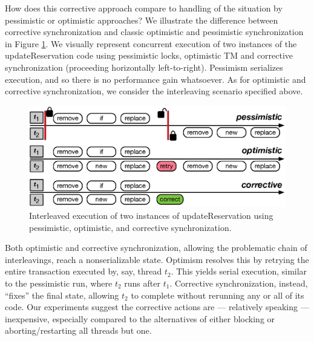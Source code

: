 %

How does this corrective approach compare to handling of the situation by pessimistic or optimistic approaches?
%
We illustrate the difference between corrective synchronization and classic optimistic and pessimistic synchronization in Figure \ref{Fi:motivatingOverview}. We visually represent concurrent execution of two instances of the \textsf{updateReservation} code using pessimistic locks, optimistic TM and corrective synchronization (proceeding horizontally left-to-right). Pessimism serializes execution, and so there is no performance gain whatsoever. As for optimistic and corrective synchronization, we consider the interleaving scenario specified above. %
%
\begin{figure}[t]
	\begin{center}
	\includegraphics[width=\textwidth]{diagram.eps}
	\end{center}
	\vspace{-0.6cm}\caption{\label{Fi:motivatingOverview}Interleaved execution of two instances of \textsf{updateReservation} using pessimistic, optimistic, and corrective synchronization.}
        \vspace{-0.4cm}
\end{figure}
%
Both optimistic and corrective synchronization, allowing the problematic chain of interleavings, reach a nonserializable state. Optimism resolves this by retrying the entire transaction executed by, say, thread $t_2$. This yields serial execution, similar to the pessimistic run, where $t_2$ runs after $t_1$. Corrective synchronization, instead, ``fixes'' the final state, allowing $t_2$ to complete without rerunning any or all of its code.
%
Our experiments suggest the corrective actions are --- relatively speaking --- inexpensive, especially compared to the alternatives of either blocking or aborting/restarting all threads but one.


